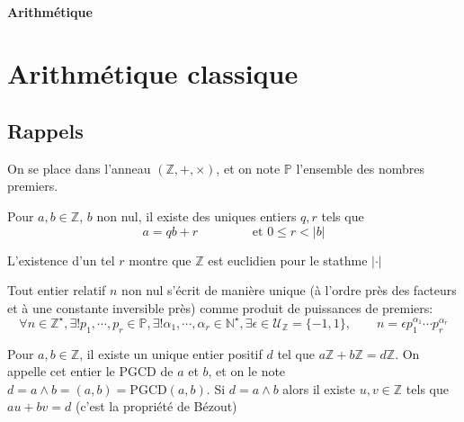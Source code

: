 \ifsolo
    ~

    \vspace{1cm}

    \begin{center}
        \textbf{\LARGE Arithmétique} \\[1em]
    \end{center}
    \tableofcontents
\else
    \minitoc
\fi
\thispagestyle{empty}

\ifsolo \newpage \setcounter{page}{1} \fi
\section{Arithmétique classique}

\subsection{Rappels}

On se place dans l'anneau $(\mathbb Z, +, \times)$, et on note $\mathbb P$ l'ensemble des nombres premiers.

\begin{thm}
     Pour $a, b\in\mathbb Z$, $b$ non nul, il existe des uniques entiers $q, r$ tels que \[
        a=qb+r\qquad \qquad \text{ et } 0\leq r<|b|
    \]
\end{thm}

\begin{rem}
    L'existence d'un tel $r$ montre que $\mathbb Z$ est euclidien pour le stathme $|\cdot|$
\end{rem}

\begin{thm}
    Tout entier relatif $n$ non nul s'écrit de manière unique (à l'ordre près des facteurs et à une constante inversible près) comme produit de puissances de premiers: \[
        \forall n\in\mathbb Z^\star, \exists! p_1, \cdots, p_r\in\mathbb P, \exists! \alpha_1, \cdots, \alpha_r\in\mathbb N^\star, \exists \epsilon\in\mathcal U_{\mathbb Z}=\{-1, 1\}, \qquad n=\epsilon p_1^{\alpha_1}\cdots p_r^{\alpha_r}
    \]
\end{thm}

\begin{thmdef}
    Pour $a, b\in\mathbb Z$, il existe un unique entier positif $d$ tel que $a\mathbb Z+b\mathbb Z=d\mathbb Z$. On appelle cet entier le PGCD de $a$ et $b$, et on le note $d=a\land b=(a, b)=\mathrm{PGCD}(a, b)$. Si $d=a\land b$ alors il existe $u, v\in \mathbb Z$ tels que $au+bv=d$ (c'est la  propriété de Bézout)
\end{thmdef}

